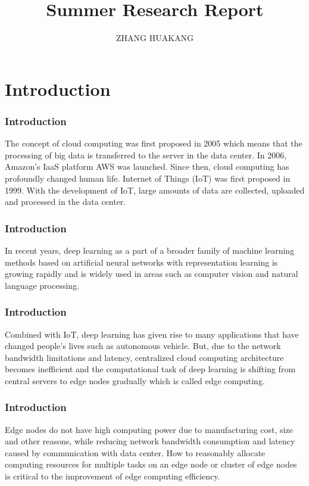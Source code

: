 \documentclass{beamer}
\title{Summer Research Report}
\author{ZHANG HUAKANG}
\begin{document}
\frame{\titlepage}
\section{Introduction}
\begin{frame}
    \frametitle{Introduction}
    The concept of cloud computing was first proposed in 2005 which means that the processing of big data is transferred to the server in the data center. In 2006, Amazon's IaaS platform AWS was launched. Since then, cloud computing has profoundly changed human life. Internet of Things (IoT) was first proposed in 1999. With the development of IoT, large amounts of data are collected, uploaded and processed in the data center. 
\end{frame}
\begin{frame}
    \frametitle{Introduction}
    In recent years, deep learning as a part of a broader family of machine learning methods based on artificial neural networks with representation learning is growing rapidly and is widely used in areas such as computer vision and natural language processing. 
\end{frame}
\begin{frame}
    \frametitle{Introduction}
    Combined with IoT, deep learning has given rise to many applications that have changed people's lives such as autonomous vehicle. But, due to the network bandwidth limitations and latency, centralized cloud computing architecture becomes inefficient and the computational task of deep learning is shifting from central servers to edge nodes gradually which is called edge computing. 
\end{frame}
\begin{frame}
    \frametitle{Introduction}
    Edge nodes do not have high computing power due to manufacturing cost, size and other reasons, while reducing network bandwidth consumption and latency caused by communication with data center. How to reasonably allocate computing resources for multiple tasks on an edge node or cluster of edge nodes is critical to the improvement of edge computing efficiency.
\end{frame}
\end{document}
